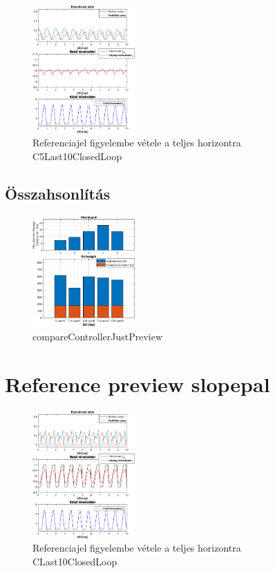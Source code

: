 \begin{figure}[H]
\centering
\includegraphics[width=0.35\textwidth, trim=0 0 0 0, clip,]{figures/onlab/NoSlope/C5Last10ClosedLoop}
\caption{Referenciajel figyelembe vétele a teljes horizontra C5Last10ClosedLoop}
\label{fig:onlab-refprev5}
\end{figure}

\subsection{Összahsonlítás}
\begin{figure}[H]
	\centering
	\includegraphics[width=0.35\textwidth, trim=0 0 0 0, clip,]{figures/onlab/NoSlope/compareControllerJustPreview}
	\caption{compareControllerJustPreview}
	\label{fig:onlab-refprevComp}
\end{figure}

\pagebreak


\section{Reference preview slopepal}

\begin{figure}[H]
	\centering
	\includegraphics[width=0.35\textwidth, trim=0 0 0 0, clip,]{figures/onlab/Slope/CLast10ClosedLoop}
	\caption{Referenciajel figyelembe vétele a teljes horizontra CLast10ClosedLoop}
	\label{fig:onlab-refslprev}
\end{figure}

